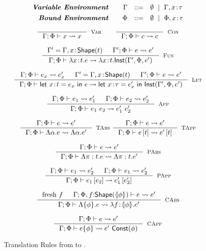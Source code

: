 \begin{figure}[t!]
$$
\begin{array}{rrcl}
\centering
 \emphbf{Variable Environment} \quad 
   & \cenv & ::=
   & \emptyset \spmid  \EXT{\cenv}{x}{\utyp}
   \\[0.05in]
 
 \emphbf{Bound Environment} \quad 
   & \benv & ::=
   & \emptyset \spmid  \EXT{\benv}{x}{\utyp}
\end{array}
$$

$$
\inference{
}{
	\txexpr{\cenv}{\benv}{x}{x}
}[\txVar]
\qquad
\inference{
}{
	\txexpr{\cenv}{\benv}{c}{c}
}[\txCon]
$$

$$
\inference{
	\cenv' = \EXT{\cenv}{x}{\toshape{\rtyp}} && \txexpr{\cenv'}{\benv}{e}{e'} 
}{
	\txexpr{\cenv}{\benv}{\efunt{x}{\rtyp}{e}}{\efunt{x}{\rtyp}{\closure{\cenv'}{\benv}{e'}{x\colon\rtyp}}}
}[\txFun]
$$
 
$$
\inference{
	\txexpr{\cenv}{\benv}{e_x}{e_x'} && \cenv' = \EXT{\cenv}{x}{\toshape{\rtyp}} &&
	\txexpr{\cenv'}{\benv}{e}{e'}
}{
	\txexpr{\cenv}{\benv}{\elet{x}{e_x}{e}{\rtyp}}
	{\elet{x}{e_x'}{\closure{\cenv'}{\benv}{e'}}{\tau}{x\colon\rtyp}}
}[\txLet]
$$

$$
\inference{
	\txexpr{\cenv}{\benv}{e_1}{e_1'} &&
	\txexpr{\cenv}{\benv}{e_2}{e_2'}
}{
	\txexpr{\cenv}{\benv}{\eapp{e_1}{e_2}}{\eapp{e_1'}{e_2'}}
}[\txApp]
$$

$$
\inference{
	\txexpr{\cenv}{\benv}{e}{e'}
}{
	\txexpr{\cenv}{\benv}{\etabs{\alpha}{e}}{\etabs{\alpha}{e'}}
}[\txTAbs]
\
\inference{
	\txexpr{\cenv}{\benv}{e}{e'}
}{
	\txexpr{\cenv}{\benv}{\etapp{e}{\rtyp}}{\etapp{e'}{\rtyp}}
}[\txTApp]
$$

$$
\inference{
	\txexpr{\cenv}{\benv}{e}{e'}
}{
	\txexpr{\cenv}{\benv}{\epabs{\rvar}{\rtyp}{e}}{\epabs{\rvar}{\rtyp}{e'}}
}[\txPAbs]
$$
 
$$
\inference{
	\txexpr{\cenv}{\benv}{e_1}{e_2'} &&
	\txexpr{\cenv}{\benv}{e_1}{e_2'}
}{
	\txexpr{\cenv}{\benv}{\epapp{e_1}{e_2}}{\epapp{e_1'}{e_2'}}
}[\txPApp]
$$
 
$$
\inference{
	\text{fresh}\ f &&
	\txexpr{\cenv}{\benv, f\colon\toshape{\txbound{\constraint}}}{e}{e'}
}{
	\txexpr{\cenv}{\benv}{\econstraint{\constraint}{e} }{\efunt{f}{\txbound{\constraint}}{e'}}
}[\txCAbs]
$$

$$
\inference{
	\txexpr{\cenv}{\benv}{e}{e'}
}{
	\txexpr{\cenv}{\benv}{\econstantconstraint{e}{\constraint}}{\eapp{e'}{\ctofun{\constraint}}}
}[\txCApp]
$$
\caption{Translation Rules from \boundedcorelan to  \corelan.}
\label{fig:translation}
\end{figure}

